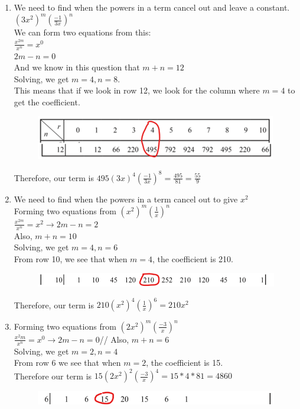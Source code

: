 \documentclass[../main.tex]{subfiles}
\begin{document}
\begin{enumerate}
    \item We need to find when the powers in a term cancel out and leave a constant. \\
    \((3x^2)^m(\frac{-1}{3x})^n\) \\
    We can form two equations from this: \\
    \( \frac{x^{2m}}{x^n} = x^0 \)\\
    \( 2m - n = 0 \)\\
    And we know in this question that \( m + n = 12\) \\
    Solving, we get \(m=4, n=8 \).\\
    This means that if we look in row 12, we look for the column where \( m=4 \) to get the coefficient.\\
    \begin{figure}[h]
        \centering
        \includegraphics[width=0.5\linewidth]{images/Picture2.png}
    \end{figure}
    Therefore, our term is \( 495(3x)^4(\frac{-1}{3x})^8 = \frac{495}{81} = \frac{55}{9}\)
    
    \item We need to find when the powers in a term cancel out to give \(x^2\)\\
    Forming two equations from \( (x^2)^m(\frac{1}{x})^n\)\\
    \( \frac{x^{2m}}{x^n}=x^2 \xrightarrow{}2m-n=2\)\\
    Also, \(m+n=10\)\\
    Solving, we get \(m=4, n=6\)\\
    From row 10, we see that when \( m=4 \), the coefficient is 210.\\
    \begin{figure}[h]
        \centering
        \includegraphics[width=0.5\linewidth]{images/Picture3.png}
    \end{figure}
    Therefore, our term is \( 210(x^2)^4(\frac{1}{x})^6=210x^2\)

    \item Forming two equations from \( (2x^2)^m(\frac{-3}{x})^n\)\\
    \( \frac{x^2m}{x^n}=x^0 \xrightarrow{}2m-n=0\)//
    Also, \( m+n=6\)\\
    Solving, we get \(m=2, n=4\)\\
    From row 6 we see that when \(m=2\), the coefficient is 15.\\
    Therefore our term is \( 15(2x^2)^2(\frac{-3}{x})^4=15*4*81=4860\)
    \begin{figure}[h]
        \centering
        \includegraphics{images/Picture4.png}
    \end{figure}


\end{enumerate}
\end{document}

